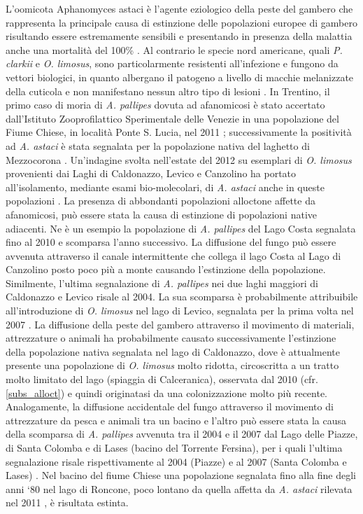 \documentclass[11pt,a4paper,italian,twoside,openany]{memoir}
\begin{document}
L'oomicota Aphanomyces astaci è l'agente eziologico della peste del gambero che rappresenta la principale causa di estinzione delle popolazioni europee di gambero risultando essere estremamente sensibili e presentando in presenza della malattia anche una mortalità del 100\% \cite{Holdich 1999}. Al contrario le specie nord americane, quali \emph{P. clarkii} e \emph{O. limosus}, sono particolarmente resistenti all'infezione e fungono da vettori biologici, in quanto albergano il patogeno a livello di macchie melanizzate della cuticola e non manifestano nessun altro tipo di lesioni \cite{Minghetti 2012b}. In Trentino, il primo caso di moria di \emph{A. pallipes} dovuta ad afanomicosi è stato accertato dall'Istituto Zooprofilattico Sperimentale delle Venezie in una popolazione del Fiume Chiese, in località Ponte S. Lucia, nel 2011 \cite{Quaglio 2011}; successivamente la positività ad \emph{A. astaci} è stata segnalata per la popolazione nativa del laghetto di Mezzocorona \cite{Cappelletti 2016}. Un'indagine svolta nell'estate del 2012 su esemplari di \emph{O. limosus} provenienti dai Laghi di Caldonazzo, Levico e Canzolino ha portato all'isolamento, mediante esami bio-molecolari, di \emph{A. astaci} anche in queste popolazioni \cite{Minghetti 2012b}. La presenza di abbondanti popolazioni alloctone affette da afanomicosi, può essere stata la causa di estinzione di popolazioni native adiacenti. Ne è un esempio la popolazione di \emph{A. pallipes} del Lago Costa segnalata fino al 2010 \cite{Endrizzi 2013} e scomparsa l'anno successivo. La diffusione del fungo può essere avvenuta attraverso il canale intermittente che collega il lago Costa al Lago di Canzolino posto poco più a monte causando l'estinzione della popolazione. Similmente, l'ultima segnalazione di \emph{A. pallipes} nei due laghi maggiori di Caldonazzo e Levico risale al 2004. La sua scomparsa è probabilmente attribuibile all'introduzione di \emph{O. limosus} nel lago di Levico, segnalata per la prima volta nel 2007 \cite{Paoli 2008}. La diffusione della peste del gambero attraverso il movimento di materiali, attrezzature o animali ha probabilmente causato successivamente l'estinzione della popolazione nativa segnalata nel lago di Caldonazzo, dove è attualmente presente una popolazione di \emph{O. limosus} molto ridotta, circoscritta a un tratto molto limitato del lago (spiaggia di Calceranica), osservata dal 2010 (cfr. \ref{subs_alloct}) e quindi originatasi da una colonizzazione molto più recente. Analogamente, la diffusione accidentale del fungo attraverso il movimento di attrezzature da pesca e animali tra un bacino e l'altro può essere stata la causa della scomparsa di \emph{A. pallipes} avvenuta tra il 2004 e il 2007 dal Lago delle Piazze, di Santa Colomba e di Lases (bacino del Torrente Fersina), per i quali l'ultima segnalazione risale rispettivamente al 2004 (Piazze) e al 2007 (Santa Colomba e Lases) \cite{Endrizzi 2013}. Nel bacino del fiume Chiese una popolazione segnalata fino alla fine degli anni ‘80 nel lago di Roncone, poco lontano da quella affetta da \emph{A. astaci} rilevata nel 2011 \cite{Quaglio 2011}, è risultata estinta.
\end{document}

